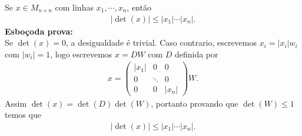 \begin{example}
  Se $x\in M_{n\times n}$ com linhas $x_1,\cdots,x_n$, então
  \begin{align*}
    |\det(x)|\leq |x_1|\cdots|x_n|.
  \end{align*}
  \textbf{Esboçoda prova:}\\
  Se $\det(x)=0$, a desigualdade é trivial. Caso contrario, escrevemos $x_i=|x_i|w_i$ com $|w_i|=1$, logo escrevemos $x=DW$ com $D$ definida por 
  \begin{align*}
    x=\begin{pmatrix}
      |x_1| & 0 & 0\\
      0 & \ddots & 0\\
      0 & 0 & |x_n|
    \end{pmatrix}W.
  \end{align*}
  Assim $\det(x)=\det(D)\det(W)$, portanto provando que $\det(W)\leq 1$ temos que
  \begin{align*}
    |\det(x)|\leq |x_1|\cdots|x_n|.
  \end{align*}
\end{example}
